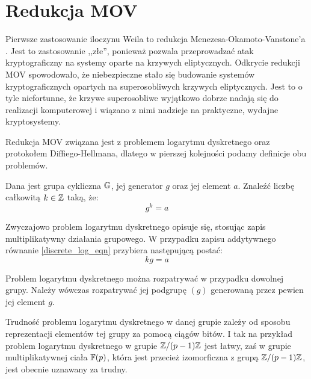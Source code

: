 \section{Redukcja MOV}

\noindent
Pierwsze zastosowanie iloczynu Weila
to redukcja Menezesa-Okamoto-Vanstone'a \cite{menezesokamotovanstone}.
Jest to zastosowanie ,,złe'',
ponieważ pozwala przeprowadzać atak kryptograficzny
na systemy oparte na krzywych eliptycznych.
Odkrycie redukcji MOV spowodowało,
że niebezpieczne stało się budowanie systemów kryptograficznych
opartych na superosobliwych krzywych eliptycznych.
Jest to o tyle niefortunne,
że krzywe superosobliwe wyjątkowo dobrze nadają się do
realizacji komputerowej
i wiązano z nimi nadzieje na praktyczne, wydajne kryptosystemy.

\noindent
Redukcja MOV związana jest
z problemem logarytmu dyskretnego oraz protokołem Diff\-iego-Hell\-mana,
dlatego w pierszej kolejności podamy definicje obu problemów.

\begin{problem}
Dana jest grupa cykliczna $\mathbb{G}$,
jej generator $g$
oraz jej element $a$.
Znaleźć liczbę całkowitą $k \in \mathbb{Z}$ taką, że:
\begin{equation}\label{discrete_log_eqn}
g^k = a
\end{equation}
\end{problem}

\begin{remark}
Zwyczajowo problem logarytmu dyskretnego opisuje się,
stosując zapis multiplikatywny działania grupowego.
W przypadku zapisu addytywnego równanie \ref{discrete_log_eqn}
przybiera następującą postać:
\begin{equation}\label{discrete_log_additive_eqn}
kg = a
\end{equation}
\end{remark}

\begin{remark}
Problem logarytmu dyskretnego można rozpatrywać w przypadku dowolnej grupy.
Należy wówczas rozpatrywać jej podgrupę $(g)$
generowaną przez pewien jej element $g$.
\end{remark}

\begin{remark}
Trudność problemu logarytmu dyskretnego w danej grupie
zależy od sposobu reprezentacji elementów tej grupy
za pomocą ciągów bitów.
I tak na przykład problem logarytmu dyskretnego w grupie $\mathbb{Z} / (p-1)\mathbb{Z}$
jest łatwy,
zaś w grupie multiplikatywnej ciała $\mathbb{F}(p)$,
która jest przecież izomorficzna z grupą $\mathbb{Z} / (p-1)\mathbb{Z}$,
jest obecnie uznawany za trudny.
\end{remark}

